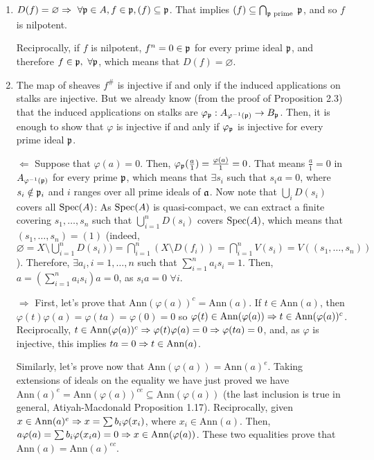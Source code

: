 \begin{sol}
	\begin{enumerate}[label=\alph*)]
		\item $D(f) = \varnothing \Rightarrow \, \, \forall \mathfrak{p} \in A, f \in \mathfrak{p}, (f) \subseteq \mathfrak{p}$. That implies $(f) \subseteq \bigcap_{\mathfrak{p} \text{ prime }} \mathfrak{p}$, and so $f$ is nilpotent.

		Reciprocally, if $f$ is nilpotent, $f^n = 0 \in \mathfrak{p}$ for every prime ideal $\mathfrak{p}$, and therefore $f \in \mathfrak{p}, \, \, \forall \mathfrak{p}$, which means that $D(f) = \varnothing$.

		\item The map of sheaves $f^{\#}$ is injective if and only if the induced applications on stalks are injective. But we already know (from the proof of Proposition 2.3) that the induced applications on stalks are $\varphi_{\mathfrak{p}}: A_{\varphi^{-1}(\mathfrak{p})} \to B_{\mathfrak{p}}$. Then, it is enough to show that $\varphi$ is injective if and anly if $\varphi_{\mathfrak{p}}$ is injective for every prime ideal $\mathfrak{p}$.

		$\boxed{\Leftarrow}$ Suppose that $\varphi(a) = 0$. Then, $\varphi_{\mathfrak{p}}(\frac{a}{1}) = \frac{\varphi(a)}{1} = 0$. That means $\frac{a}{1} = 0$ in $A_{\varphi^{-1}(\mathfrak{p})}$ for every prime $\mathfrak{p}$, which means that $\exists s_i$ such that $s_i a = 0$, where $s_i \notin \mathfrak{p}_i$ and $i$ ranges over all prime ideals of $\mathfrak{a}$. Now note that $\bigcup_i D(s_i)$ covers all $\mathrm{Spec}(A)$: As $\mathrm{Spec}(A)$ is quasi-compact, we can extract a finite covering $s_1, \dots, s_n$ such that $\bigcup_{i = 1}^n D(s_i)$ covers $\mathrm{Spec}(A)$, which means that $(s_1, \dots, s_n) = (1)$ (indeed, $\varnothing = X\setminus \bigcup_{i = 1}^n D(s_i)) = \bigcap_{i = 1}^n (X\setminus D(f_i)) = \bigcap_{i = 1}^n V(s_i) = V((s_1, \dots, s_n))$). Therefore, $\exists a_i, i = 1, \dots, n$ such that $\sum_{i = 1}^n a_i s_i = 1$. Then, $a = (\sum_{i = 1}^n a_i s_i)a = 0$, as $s_i a = 0 \, \, \forall i$.

		$\boxed{\Rightarrow}$ First, let's prove that $\mathrm{Ann}(\varphi(a))^c = \mathrm{Ann}(a)$. If $t \in \mathrm{Ann}(a)$, then $\varphi(t)\varphi(a) = \varphi(ta) = \varphi(0) = 0$ so $\varphi(t) \in \mathrm{Ann}(\varphi(a)) \Rightarrow t \in \mathrm{Ann}(\varphi(a))^c$. Reciprocally, $t \in \mathrm{Ann}(\varphi(a))^c \Rightarrow \varphi(t)\varphi(a) = 0 \Rightarrow \varphi(ta) = 0$, and, as $\varphi$ is injective, this implies $ta = 0 \Rightarrow t \in \mathrm{Ann}(a)$.

		Similarly, let's prove now that $\mathrm{Ann}(\varphi(a)) = \mathrm{Ann}(a)^e$. Taking extensions of ideals on the equality we have just proved we have $\mathrm{Ann}(a)^e = \mathrm{Ann}(\varphi(a))^{ce} \subseteq \mathrm{Ann}(\varphi(a))$ (the last inclusion is true in general, Atiyah-Macdonald Proposition 1.17). Reciprocally, given $x \in \mathrm{Ann}(a)^e \Rightarrow x = \sum b_i \varphi(x_i)$, where $x_i \in \mathrm{Ann}(a)$. Then, $a\varphi(a) = \sum b_i \varphi(x_i a) = 0 \Rightarrow x \in \mathrm{Ann}(\varphi(a))$. These two equalities prove that $\mathrm{Ann}(a) = \mathrm{Ann}(a)^{ec}$.


\end{enumerate}
\end{sol}
